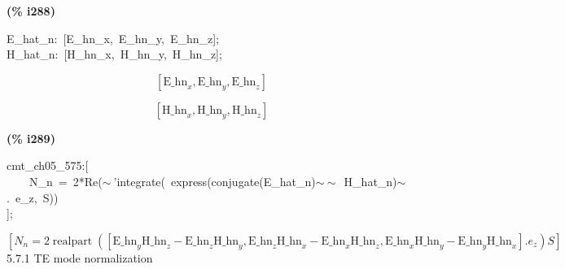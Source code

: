 \documentclass[fleqn]{article}
\begin{document}
\noindent
\begin{minipage}[t]{4.000000em}\color{red}\bfseries
(\% i288)	
\end{minipage}
\begin{minipage}[t]{\textwidth}\color{blue}
E\_hat\_n:\ [E\_hn\_x,\ E\_hn\_y,\ E\_hn\_z];\\
H\_hat\_n:\ [H\_hn\_x,\ H\_hn\_y,\ H\_hn\_z];
\end{minipage}
\[\displaystyle \tag{\% o287} 
\left[ {{\ensuremath{\mathrm{E\_ hn}}}_x}\operatorname{,}{{\ensuremath{\mathrm{E\_ hn}}}_y}\operatorname{,}{{\ensuremath{\mathrm{E\_ hn}}}_z}\right] \mbox{}\]

\[\tag{\% o288} 
\left[ {{\ensuremath{\mathrm{H\_ hn}}}_x}\operatorname{,}{{\ensuremath{\mathrm{H\_ hn}}}_y}\operatorname{,}{{\ensuremath{\mathrm{H\_ hn}}}_z}\right] \mbox{}
\]


\noindent
\begin{minipage}[t]{4.000000em}\color{red}\bfseries
(\% i289)	
\end{minipage}
\begin{minipage}[t]{\textwidth}\color{blue}
cmt\_ch05\_575:[\\
\ \ \ \ N\_n\ =\ 2*Re(\ensuremath{\sim\ }'integrate(\ express(conjugate(E\_hat\_n)\ensuremath{\sim\ }\ensuremath{\sim\ }\ H\_hat\_n)\ensuremath{\sim\ }.\ e\_z,\ S))\ \\
];
\end{minipage}
\[\displaystyle \tag{\% o289} 
\operatorname{[}{N_n}=2 \operatorname{realpart}\operatorname{(}\operatorname{[}{{\ensuremath{\mathrm{E\_ hn}}}_y} {{\ensuremath{\mathrm{H\_ hn}}}_z}-{{\ensuremath{\mathrm{E\_ hn}}}_z} {{\ensuremath{\mathrm{H\_ hn}}}_y}\operatorname{,}{{\ensuremath{\mathrm{E\_ hn}}}_z} {{\ensuremath{\mathrm{H\_ hn}}}_x}-{{\ensuremath{\mathrm{E\_ hn}}}_x} {{\ensuremath{\mathrm{H\_ hn}}}_z}\operatorname{,}{{\ensuremath{\mathrm{E\_ hn}}}_x}{{\ensuremath{\mathrm{H\_ hn}}}_y}-{{\ensuremath{\mathrm{E\_ hn}}}_y} {{\ensuremath{\mathrm{H\_ hn}}}_x}\operatorname{]}\ensuremath{\mathrm{ . }}{e_z}\operatorname{)} S\operatorname{]}\mbox{}
\]
5.7.1   TE mode normalization
\end{document}
